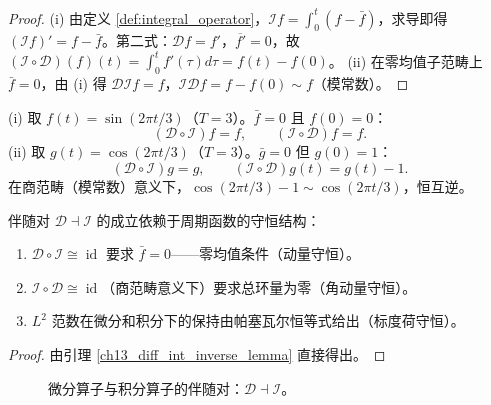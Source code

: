 \begin{proof}
(i) 由定义 \ref{def:integral_operator}，$\mathcal{I}f = \int_0^t (f - \bar{f})$，求导即得 $(\mathcal{I}f)' = f - \bar{f}$。第二式：$\mathcal{D}f = f'$，$\overline{f'} = 0$，故 $(\mathcal{I}\circ\mathcal{D})(f)(t) = \int_0^t f'(\tau)d\tau = f(t) - f(0)$。
(ii) 在零均值子范畴上 $\bar{f} = 0$，由 (i) 得 $\mathcal{D}\mathcal{I}f = f$，$\mathcal{I}\mathcal{D}f = f - f(0) \sim f$（模常数）。
\end{proof}

\begin{example}[伴随互逆的数值验证]\label{ch13_adjunction_numeric_example}
(i) 取 $f(t) = \sin(2\pi t/3)$（$T = 3$）。$\bar{f} = 0$ 且 $f(0) = 0$：
\[
(\mathcal{D}\circ\mathcal{I})f = f, \qquad (\mathcal{I}\circ\mathcal{D})f = f.
\]
(ii) 取 $g(t) = \cos(2\pi t/3)$（$T = 3$）。$\bar{g} = 0$ 但 $g(0) = 1$：
\[
(\mathcal{D}\circ\mathcal{I})g = g, \qquad (\mathcal{I}\circ\mathcal{D})g(t) = g(t) - 1.
\]
在商范畴（模常数）意义下，$\cos(2\pi t/3) - 1 \sim \cos(2\pi t/3)$，恒互逆。
\end{example}

\begin{corollary}[微分-积分伴随与守恒律]\label{cor:diff_int_conservation}
伴随对 $\mathcal{D} \dashv \mathcal{I}$ 的成立依赖于周期函数的守恒结构：
\begin{enumerate}[label=(\roman*)]
    \item $\mathcal{D} \circ \mathcal{I} \cong \operatorname{id}$ 要求 $\bar{f} = 0$——零均值条件（动量守恒）。
    \item $\mathcal{I} \circ \mathcal{D} \cong \operatorname{id}$（商范畴意义下）要求总环量为零（角动量守恒）。
    \item $L^2$ 范数在微分和积分下的保持由帕塞瓦尔恒等式给出（标度荷守恒）。
\end{enumerate}
\end{corollary}

\begin{proof}
由引理 \ref{ch13_diff_int_inverse_lemma} 直接得出。
\end{proof}

\begin{figure}[htbp]
\centering
{}
\caption{微分算子与积分算子的伴随对：$\mathcal D\dashv\mathcal I$。}
\label{fig:diff_int_adjunction}
\end{figure}

